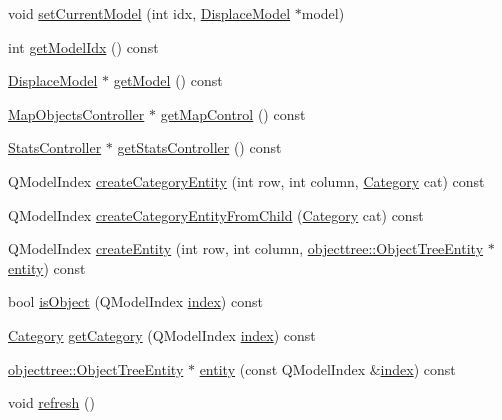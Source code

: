\begin{DoxyCompactItemize}
void \mbox{\hyperlink{class_object_tree_model_a6bb051a5a800338ad8091b6fdcc207fa}{set\+Current\+Model}} (int idx, \mbox{\hyperlink{class_displace_model}{Displace\+Model}} $\ast$model)
\item 
int \mbox{\hyperlink{class_object_tree_model_a8714ba66f3e6eabb18184f7dc33ce6b8}{get\+Model\+Idx}} () const
\item 
\mbox{\hyperlink{class_displace_model}{Displace\+Model}} $\ast$ \mbox{\hyperlink{class_object_tree_model_ad2cb4aafbda2389c7fa522f09901a57c}{get\+Model}} () const
\item 
\mbox{\hyperlink{class_map_objects_controller}{Map\+Objects\+Controller}} $\ast$ \mbox{\hyperlink{class_object_tree_model_a5c81fee872bf7dbd81ea0c57ba922faf}{get\+Map\+Control}} () const
\item 
\mbox{\hyperlink{class_stats_controller}{Stats\+Controller}} $\ast$ \mbox{\hyperlink{class_object_tree_model_af859ffac8176487917e390d0d32cc7b1}{get\+Stats\+Controller}} () const
\item 
Q\+Model\+Index \mbox{\hyperlink{class_object_tree_model_a1b013daa9bc6995e189e14a74ca4a0c6}{create\+Category\+Entity}} (int row, int column, \mbox{\hyperlink{class_object_tree_model_a379e9d6b0d381853785adf62095ba4e3}{Category}} cat) const
\item 
Q\+Model\+Index \mbox{\hyperlink{class_object_tree_model_a140e6152d9bca924d7a6b7af20f8e864}{create\+Category\+Entity\+From\+Child}} (\mbox{\hyperlink{class_object_tree_model_a379e9d6b0d381853785adf62095ba4e3}{Category}} cat) const
\item 
Q\+Model\+Index \mbox{\hyperlink{class_object_tree_model_a4a61094a1e0e7fd4036e27cfcd286f4c}{create\+Entity}} (int row, int column, \mbox{\hyperlink{classobjecttree_1_1_object_tree_entity}{objecttree\+::\+Object\+Tree\+Entity}} $\ast$\mbox{\hyperlink{class_object_tree_model_a6b8fb975df04066b195ee756a9fe1427}{entity}}) const
\item 
bool \mbox{\hyperlink{class_object_tree_model_a24f47f6e2b41adedd4779747786d65f6}{is\+Object}} (Q\+Model\+Index \mbox{\hyperlink{class_object_tree_model_afc20c3ca6732ededf4de9d3e184b21ae}{index}}) const
\item 
\mbox{\hyperlink{class_object_tree_model_a379e9d6b0d381853785adf62095ba4e3}{Category}} \mbox{\hyperlink{class_object_tree_model_a509feedd50256805227bbadd74b1fe3e}{get\+Category}} (Q\+Model\+Index \mbox{\hyperlink{class_object_tree_model_afc20c3ca6732ededf4de9d3e184b21ae}{index}}) const
\item 
\mbox{\hyperlink{classobjecttree_1_1_object_tree_entity}{objecttree\+::\+Object\+Tree\+Entity}} $\ast$ \mbox{\hyperlink{class_object_tree_model_a6b8fb975df04066b195ee756a9fe1427}{entity}} (const Q\+Model\+Index \&\mbox{\hyperlink{class_object_tree_model_afc20c3ca6732ededf4de9d3e184b21ae}{index}}) const
\item 
void \mbox{\hyperlink{class_object_tree_model_a2f10aa9da0633e30acd799d64a70cd09}{refresh}} ()
\end{DoxyCompactItemize}
